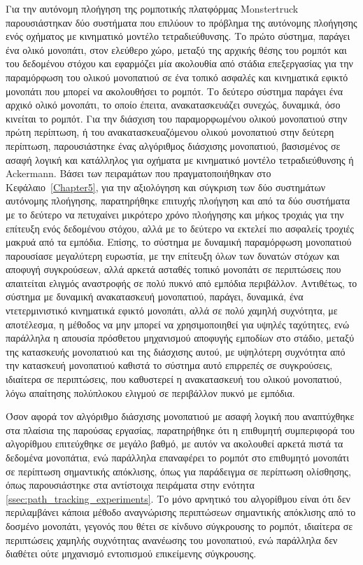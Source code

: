 \bigskip
Για την αυτόνομη πλοήγηση της ρομποτικής πλατφόρμας Monstertruck παρουσιάστηκαν δύο συστήματα που επιλύουν το πρόβλημα της αυτόνομης πλοήγησης ενός οχήματος με κινηματικό μοντέλο τετραδιεύθυνσης. Το πρώτο σύστημα, παράγει ένα ολικό μονοπάτι, στον ελεύθερο χώρο, μεταξύ της αρχικής θέσης του ρομπότ και του δεδομένου στόχου και εφαρμόζει μία ακολουθία από στάδια επεξεργασίας για την παραμόρφωση του ολικού μονοπατιού σε ένα τοπικό ασφαλές και κινηματικά εφικτό μονοπάτι που μπορεί να ακολουθήσει το ρομπότ. Το δεύτερο σύστημα παράγει ένα αρχικό ολικό μονοπάτι, το οποίο έπειτα, ανακατασκευάζει συνεχώς, δυναμικά, όσο κινείται το ρομπότ. Για την διάσχιση του παραμορφωμένου ολικού μονοπατιού στην πρώτη περίπτωση, ή του ανακατασκευαζόμενου ολικού μονοπατιού στην δεύτερη περίπτωση, παρουσιάστηκε ένας αλγόριθμος διάσχισης μονοπατιού, βασισμένος σε ασαφή λογική και κατάλληλος για οχήματα με κινηματικό μοντέλο τετραδιεύθυνσης ή Ackermann. Βάσει των πειραμάτων που πραγματοποιήθηκαν στο Κεφάλαιο~\ref{Chapter5}, για την αξιολόγηση και σύγκριση των δύο συστημάτων αυτόνομης πλοήγησης, παρατηρήθηκε επιτυχής πλοήγηση και από τα δύο συστήματα με το δεύτερο να πετυχαίνει μικρότερο χρόνο πλοήγησης και μήκος τροχιάς για την επίτευξη ενός δεδομένου στόχου, αλλά με το δεύτερο να εκτελεί πιο ασφαλείς τροχιές μακρυά από τα εμπόδια. Επίσης, το σύστημα με δυναμική παραμόρφωση μονοπατιού παρουσίασε μεγαλύτερη ευρωστία, με την επίτευξη όλων των δυνατών στόχων και αποφυγή συγκρούσεων, αλλά αρκετά ασταθές τοπικό μονοπάτι σε περιπτώσεις που απαιτείται ελιγμός αναστροφής σε πολύ πυκνό από εμπόδια περιβάλλον. Αντιθέτως, το σύστημα με δυναμική ανακατασκευή μονοπατιού, παράγει, δυναμικά, ένα ντετερμινιστικό κινηματικά εφικτό μονοπάτι, αλλά σε πολύ χαμηλή συχνότητα, με αποτέλεσμα, η μέθοδος να μην μπορεί να χρησιμοποιηθεί για υψηλές ταχύτητες, ενώ παράλληλα η απουσία πρόσθετου μηχανισμού αποφυγής εμποδίων στο στάδιο, μεταξύ της κατασκευής μονοπατιού και της διάσχισης αυτού, με υψηλότερη συχνότητα από την κατασκευή μονοπατιού καθιστά το σύστημα αυτό επιρρεπές σε συγκρούσεις, ιδιαίτερα σε περιπτώσεις, που καθυστερεί η ανακατασκευή του ολικού μονοπατιού, λόγω απαίτησης πολύπλοκου ελιγμού σε περιβάλλον πυκνό με εμπόδια.

\bigskip
Όσον αφορά τον αλγόριθμο διάσχισης μονοπατιού με ασαφή λογική που αναπτύχθηκε στα πλαίσια της παρούσας εργασίας, παρατηρήθηκε ότι η επιθυμητή συμπεριφορά του αλγορίθμου επιτεύχθηκε σε μεγάλο βαθμό, με αυτόν να ακολουθεί αρκετά πιστά τα δεδομένα μονοπάτια, ενώ παράλληλα επαναφέρει το ρομπότ στο επιθυμητό μονοπάτι σε περίπτωση σημαντικής απόκλισης, όπως για παράδειγμα σε περίπτωση ολίσθησης, όπως παρουσιάστηκε στα αντίστοιχα πειράματα στην ενότητα \ref{ssec:path_tracking_experiments}. Το μόνο αρνητικό του αλγορίθμου είναι ότι δεν περιλαμβάνει κάποια μέθοδο αναγνώρισης περιπτώσεων σημαντικής απόκλισης από το δοσμένο μονοπάτι, γεγονός που θέτει σε κίνδυνο σύγκρουσης το ρομπότ, ιδιαίτερα σε περιπτώσεις χαμηλής συχνότητας ανανέωσης του μονοπατιού, ενώ παράλληλα δεν διαθέτει ούτε μηχανισμό εντοπισμού επικείμενης σύγκρουσης.


